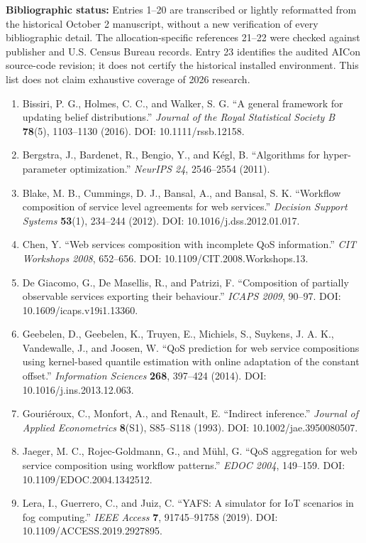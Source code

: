 \documentclass[10pt,a4paper]{article}
\begin{document}
\textbf{Bibliographic status:} Entries 1--20 are transcribed or lightly reformatted from the historical October 2 manuscript, without a new verification of every bibliographic detail. The allocation-specific references 21--22 were checked against publisher and U.S. Census Bureau records. Entry 23 identifies the audited AICon source-code revision; it does not certify the historical installed environment. This list does not claim exhaustive coverage of 2026 research.

\begin{enumerate}
\item Bissiri, P. G., Holmes, C. C., and Walker, S. G. “A general framework for updating belief distributions.” \emph{Journal of the Royal Statistical Society B} \textbf{78}(5), 1103–1130 (2016). DOI: 10.1111/rssb.12158.
\item Bergstra, J., Bardenet, R., Bengio, Y., and Kégl, B. “Algorithms for hyper-parameter optimization.” \emph{NeurIPS 24}, 2546–2554 (2011).
\item Blake, M. B., Cummings, D. J., Bansal, A., and Bansal, S. K. “Workflow composition of service level agreements for web services.” \emph{Decision Support Systems} \textbf{53}(1), 234–244 (2012). DOI: 10.1016/j.dss.2012.01.017.
\item Chen, Y. “Web services composition with incomplete QoS information.” \emph{CIT Workshops 2008}, 652–656. DOI: 10.1109/CIT.2008.Workshops.13.
\item De Giacomo, G., De Masellis, R., and Patrizi, F. “Composition of partially observable services exporting their behaviour.” \emph{ICAPS 2009}, 90–97. DOI: 10.1609/icaps.v19i1.13360.
\item Geebelen, D., Geebelen, K., Truyen, E., Michiels, S., Suykens, J. A. K., Vandewalle, J., and Joosen, W. “QoS prediction for web service compositions using kernel-based quantile estimation with online adaptation of the constant offset.” \emph{Information Sciences} \textbf{268}, 397–424 (2014). DOI: 10.1016/j.ins.2013.12.063.
\item Gouriéroux, C., Monfort, A., and Renault, E. “Indirect inference.” \emph{Journal of Applied Econometrics} \textbf{8}(S1), S85–S118 (1993). DOI: 10.1002/jae.3950080507.
\item Jaeger, M. C., Rojec-Goldmann, G., and Mühl, G. “QoS aggregation for web service composition using workflow patterns.” \emph{EDOC 2004}, 149–159. DOI: 10.1109/EDOC.2004.1342512.
\item Lera, I., Guerrero, C., and Juiz, C. “YAFS: A simulator for IoT scenarios in fog computing.” \emph{IEEE Access} \textbf{7}, 91745–91758 (2019). DOI: 10.1109/ACCESS.2019.2927895.

\end{enumerate}
\end{document}

